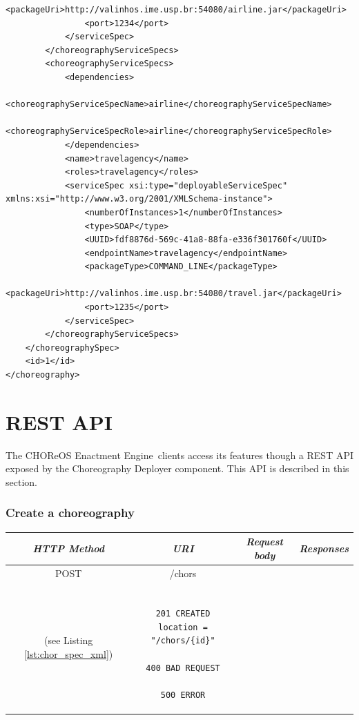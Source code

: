 \documentclass[a4paper, 10pt]{article}
\newcommand{\ee}{CHOReOS Enactment Engine}
\begin{document}
{\begin{lstlisting}[caption=Choreography XML representation example, label=lst:chor_xml]
                <packageUri>http://valinhos.ime.usp.br:54080/airline.jar</packageUri>
                <port>1234</port>
            </serviceSpec>
        </choreographyServiceSpecs>
        <choreographyServiceSpecs>
            <dependencies>
                <choreographyServiceSpecName>airline</choreographyServiceSpecName>
                <choreographyServiceSpecRole>airline</choreographyServiceSpecRole>
            </dependencies>
            <name>travelagency</name>
            <roles>travelagency</roles>
            <serviceSpec xsi:type="deployableServiceSpec" 
xmlns:xsi="http://www.w3.org/2001/XMLSchema-instance">
                <numberOfInstances>1</numberOfInstances>
                <type>SOAP</type>
                <UUID>fdf8876d-569c-41a8-88fa-e336f301760f</UUID>
                <endpointName>travelagency</endpointName>
                <packageType>COMMAND_LINE</packageType>
                <packageUri>http://valinhos.ime.usp.br:54080/travel.jar</packageUri>
                <port>1235</port>
            </serviceSpec>
        </choreographyServiceSpecs>
    </choreographySpec>
    <id>1</id>
</choreography>
\end{lstlisting}

}

\section{REST API}
\label{sec:api}

The \ee\ clients access its features though a REST API exposed by the Choreography Deployer component. This API is described in this section.

\subsubsection*{Create a choreography}

\begin{tabular}{|c|c|c|c|}
\hline 
\itshape{HTTP Method} & \itshape{URI} & \itshape{Request body} & \itshape{Responses} \\ 
\hline 
POST & /chors & 

\begin{minipage}{2in}
\verb!ChorSpec! XML representation \\ 
(see Listing \ref{lst:chor_spec_xml})
\end{minipage} 
&

\begin{minipage}{2in}
\begin{verbatim}

201 CREATED
location = "/chors/{id}"

400 BAD REQUEST

500 ERROR

\end{verbatim}
\end{minipage} 
\\ 
\hline 
\end{tabular} \\
\end{document}
